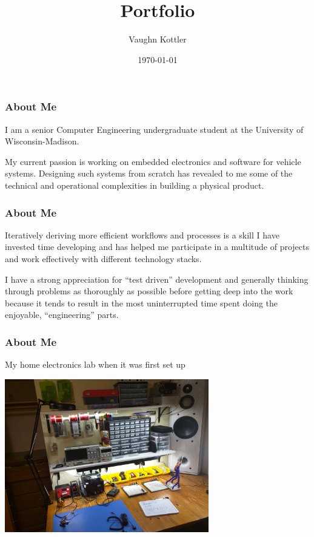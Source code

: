 \documentclass{beamer}
\title{Portfolio}
\author{Vaughn Kottler}
\date{\today}
\begin{document}

\begin{frame}
\frametitle{About Me}
    I am a senior Computer Engineering undergraduate student
    at the University of Wisconsin-Madison.
    \break

    My current passion is working on embedded electronics and software for
    vehicle systems. Designing such systems from scratch has revealed
    to me some of the technical and operational complexities in building a
    physical product.
\end{frame}

\begin{frame}
\frametitle{About Me}
    Iteratively deriving more efficient workflows and processes is a skill
    I have invested time developing and has helped me participate in a
    multitude of projects and work effectively with different technology
    stacks.
    \break

    I have a strong appreciation for ``test driven'' development and generally
    thinking through problems as thoroughly as possible before getting deep into
    the work because it tends to
    result in the most uninterrupted time spent doing the enjoyable, ``engineering'' parts.
\end{frame}

\begin{frame}
\frametitle{About Me}
    My home electronics lab when it was first set up
\begin{center}
    \includegraphics[width=3.5in]{assets/HomeLab}
\end{center}
\end{frame}
\end{document}
